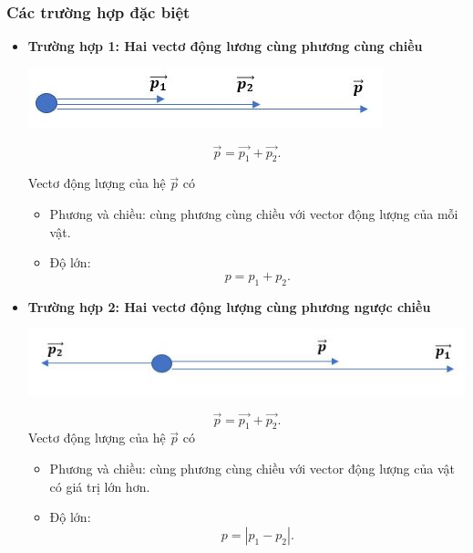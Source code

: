 \subsubsection{Các trường hợp đặc biệt}
\begin{itemize}
	\item \textbf{Trường hợp 1: Hai vectơ động lương cùng phương cùng chiều} 
	\begin{center}
		\includegraphics[scale=0.6]{../figs/VN10-PH-29-L-021-2-1.JPG}
	\end{center}
	\begin{equation*}
		\vec {p} = \vec {p_1} + \vec{p_2}.
	\end{equation*}
	
	Vectơ động lượng của hệ $\vec{p}$ có 
	\begin{itemize}
		\item Phương và chiều: cùng phương cùng chiều với vector động lượng của mỗi vật.
		\item Độ lớn: $$p=p_1+p_2.$$ 
	\end{itemize}
	
	\item \textbf{Trường hợp 2: Hai vectơ động lượng cùng phương ngược chiều}
	\begin{center}
		\includegraphics[scale=0.6]{../figs/VN10-PH-29-L-021-2-2.JPG}
	\end{center}
	\begin{equation*}
		\vec {p} = \vec {p_1} + \vec{p_2}.
	\end{equation*}
	Vectơ động lượng của hệ $\vec{p}$ có 
	\begin{itemize}
		\item Phương và chiều: cùng phương cùng chiều với vector động lượng của vật có giá trị lớn hơn.
		\item Độ lớn: $$p=|p_1-p_2|.$$
	\end{itemize}
	

\end{itemize}
